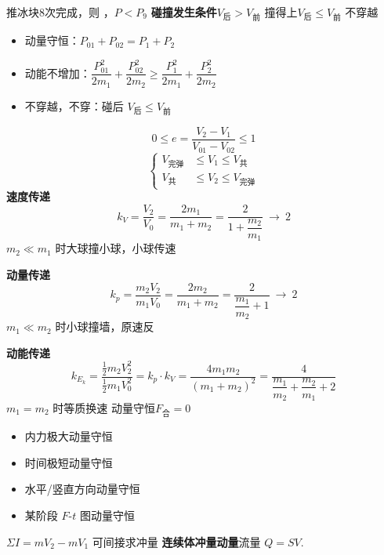 推冰块8次完成，则 ，$P<P_9$ %
\textbf{碰撞发生条件}\quad $V_{\text{后}}>V_{\text{前}}$ 撞得上\quad $V_{\text{后}}\le V_{\text{前}}$ 不穿越
\begin{itemize}
\item 动量守恒：$P_{01}+P_{02}=P_1+P_2$
\item 动能不增加：$\dfrac{P_{01}^2}{2m_1}+\dfrac{P_{02}^2}{2m_2}\ge\dfrac{P_1^2}{2m_1}+\dfrac{P_2^2}{2m_2}$ %
\item 不穿越，不穿：碰后 $V_{\text{后}}\le V_{\text{前}}$
\end{itemize}
\[
0\le e=\frac{V_2-V_1}{V_{01}-V_{02}}\le1
\]
\[
\left\{\begin{aligned}
V_{\text{完弹}}&\le V_1\le V_{\text{共}}\\
V_{\text{共}}&\le V_2\le V_{\text{完弹}}
\end{aligned}\right.
\]
\textbf{速度传递}
\[
k_V=\frac{V_2}{V_0}=\frac{2m_1}{m_1+m_2}=\frac{2}{1+\dfrac{m_2}{m_1}}\ \to\ 2
\]
$m_2\ll m_1$ 时大球撞小球，小球传速\, %

\textbf{动量传递}
\[
k_p=\frac{m_2V_2}{m_1V_0}=\frac{2m_2}{m_1+m_2}=\frac{2}{\dfrac{m_1}{m_2}+1}\ \to\ 2
\]
$m_1\ll m_2$ 时小球撞墙，原速\red{$\times$}反 %

\textbf{动能传递}
\[
k_{E_k}=\frac{\frac12m_2V_2^2}{\frac12m_1V_0^2}=k_p\cdot k_V=\frac{4m_1m_2}{(m_1+m_2)^2}=\frac{4}{\dfrac{m_1}{m_2}+\dfrac{m_2}{m_1}+2}
\]
$m_1=m_2$ 时等质换速
动量守恒\quad $F_{\text{合}}=0$
\begin{itemize}
\item 内力极大动量守恒
\item 时间极短动量守恒
\item 水平/竖直方向动量守恒
\item 某阶段 $F$-$t$ 图动量守恒
\end{itemize}
$\Sigma I=mV_2-mV_1$ 可间接求冲量
\textbf{连续体冲量动量}\quad 流量 $Q=SV$.


